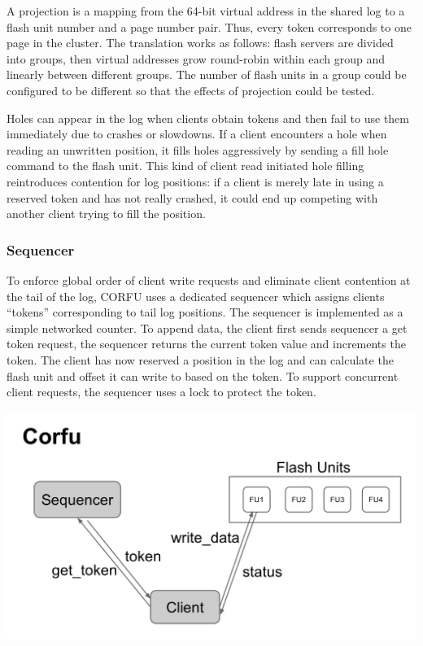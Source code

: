 \documentclass[letterpaper,twocolumn,10pt]{article}
\begin{document}
A projection is a mapping from the 64-bit virtual address in the shared log to a flash unit number and a page number pair. Thus, every token  corresponds to one page in the cluster. The translation works as follows: flash servers are divided into groups, then virtual addresses grow round-robin within each group and linearly between different groups. The number of flash units in a group could be configured to be different so that the effects of projection could be tested.

Holes can appear in the log when clients obtain tokens and then fail to use them immediately due to crashes or slowdowns. If a client encounters a hole when reading an unwritten position, it fills holes aggressively by sending a fill hole command to the flash unit. This kind of client read initiated hole filling reintroduces contention for log positions: if a client is merely late in using a reserved token and has not really crashed, it could end up competing with another client trying to fill the position.

\subsubsection{Sequencer}
To enforce global order of client write requests and eliminate client contention at the tail of the log, CORFU uses a dedicated sequencer which assigns clients “tokens” corresponding to tail log positions. The sequencer is implemented as a simple networked counter. To append data, the client first sends sequencer a get token request, the sequencer returns the current token value and increments the token. The client has now reserved a position in the log and can calculate the flash unit and offset it can write to based on the token. To support concurrent client requests, the sequencer uses a lock to protect the token.

\begin{center}
\includegraphics[width=.5\textwidth]{1.png}
\end{center}
\end{document}
